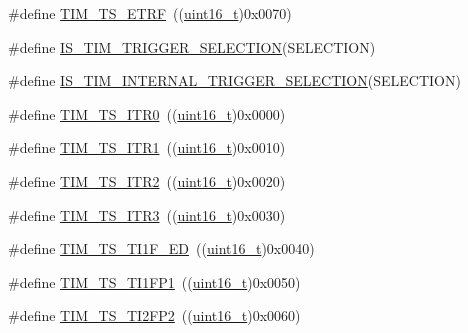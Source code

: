 \begin{DoxyCompactItemize}
\item 
\#define \hyperlink{group___t_i_m___internal___trigger___selection_gaece08e02e056613a882aa7ff0a6ccc2d}{T\+I\+M\+\_\+\+T\+S\+\_\+\+E\+T\+RF}~((\hyperlink{_p_e___types_8h_a1f1825b69244eb3ad2c7165ddc99c956}{uint16\+\_\+t})0x0070)
\item 
\#define \hyperlink{group___t_i_m___internal___trigger___selection_ga36e47cf625c695a368a68280e950dfbc}{I\+S\+\_\+\+T\+I\+M\+\_\+\+T\+R\+I\+G\+G\+E\+R\+\_\+\+S\+E\+L\+E\+C\+T\+I\+ON}(S\+E\+L\+E\+C\+T\+I\+ON)
\item 
\#define \hyperlink{group___t_i_m___internal___trigger___selection_ga1ce6c387021e2fdaf3fa3d7cd3eae962}{I\+S\+\_\+\+T\+I\+M\+\_\+\+I\+N\+T\+E\+R\+N\+A\+L\+\_\+\+T\+R\+I\+G\+G\+E\+R\+\_\+\+S\+E\+L\+E\+C\+T\+I\+ON}(S\+E\+L\+E\+C\+T\+I\+ON)
\item 
\#define \hyperlink{group___t_i_m___internal___trigger___selection_gab7cf2b7db3956d4fd1e5a5d84f4891e7}{T\+I\+M\+\_\+\+T\+S\+\_\+\+I\+T\+R0}~((\hyperlink{_p_e___types_8h_a1f1825b69244eb3ad2c7165ddc99c956}{uint16\+\_\+t})0x0000)
\item 
\#define \hyperlink{group___t_i_m___internal___trigger___selection_gad90fbca297153ca9c0112a67ea2c6cb3}{T\+I\+M\+\_\+\+T\+S\+\_\+\+I\+T\+R1}~((\hyperlink{_p_e___types_8h_a1f1825b69244eb3ad2c7165ddc99c956}{uint16\+\_\+t})0x0010)
\item 
\#define \hyperlink{group___t_i_m___internal___trigger___selection_ga8599ba58a5f911d648503c7ac55d4320}{T\+I\+M\+\_\+\+T\+S\+\_\+\+I\+T\+R2}~((\hyperlink{_p_e___types_8h_a1f1825b69244eb3ad2c7165ddc99c956}{uint16\+\_\+t})0x0020)
\item 
\#define \hyperlink{group___t_i_m___internal___trigger___selection_ga63183e611b91c5847040172c0069514d}{T\+I\+M\+\_\+\+T\+S\+\_\+\+I\+T\+R3}~((\hyperlink{_p_e___types_8h_a1f1825b69244eb3ad2c7165ddc99c956}{uint16\+\_\+t})0x0030)
\item 
\#define \hyperlink{group___t_i_m___internal___trigger___selection_ga8c89554efc693e679c94b5a749af123c}{T\+I\+M\+\_\+\+T\+S\+\_\+\+T\+I1\+F\+\_\+\+ED}~((\hyperlink{_p_e___types_8h_a1f1825b69244eb3ad2c7165ddc99c956}{uint16\+\_\+t})0x0040)
\item 
\#define \hyperlink{group___t_i_m___internal___trigger___selection_ga38d3514d54bcdb0ea8ac8bd91c5832b5}{T\+I\+M\+\_\+\+T\+S\+\_\+\+T\+I1\+F\+P1}~((\hyperlink{_p_e___types_8h_a1f1825b69244eb3ad2c7165ddc99c956}{uint16\+\_\+t})0x0050)
\item 
\#define \hyperlink{group___t_i_m___internal___trigger___selection_ga0ed58a269bccd3f22d19cc9a2ba3123f}{T\+I\+M\+\_\+\+T\+S\+\_\+\+T\+I2\+F\+P2}~((\hyperlink{_p_e___types_8h_a1f1825b69244eb3ad2c7165ddc99c956}{uint16\+\_\+t})0x0060)

\end{DoxyCompactItemize}
